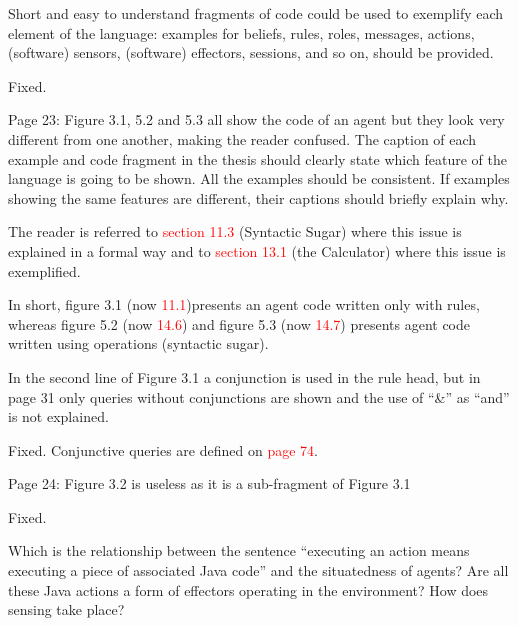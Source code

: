 \documentclass{article}
\newcommand*\R[1]{\textcolor{red}{#1}} %
\newcommand{\todo}[1]{[\textcolor{green}{TODO}: #1]}
\newenvironment{them}{\noindent\begingroup\color{blue}}{\endgroup\par}
\begin{document}
\begin{them}

Short and easy to understand fragments of code could be used to exemplify each
element of the language: examples for beliefs, rules, roles, messages, actions,
(software) sensors, (software) effectors, sessions, and so on, should be
provided.

\end{them}
Fixed. 

\begin{them}

Page 23:
Figure 3.1, 5.2 and 5.3 all show the code of an agent but they look very
different from one another, making the reader confused. The caption of each
example and code fragment in the thesis should clearly state which feature of
the language is going to be shown. All the examples should be consistent. If
examples showing the same features are different, their captions should briefly
explain why.

\end{them}
The reader is referred to \R{section 11.3} (Syntactic Sugar) where this issue
is explained in a formal way and to \R{section 13.1} (the Calculator) where
this issue is exemplified.

In short, figure 3.1 (now \R{11.1})presents an agent code written only with
rules, whereas figure 5.2 (now \R{14.6}) and figure 5.3 (now \R{14.7}) presents
agent code written using operations (syntactic sugar).

\begin{them}

In the second line of Figure 3.1 a conjunction is used in the rule head, but in
page 31 only queries without conjunctions are shown and the use of “\&” as
“and” is not explained.

\end{them}
Fixed. Conjunctive queries are defined on \R{page 74}. 

\begin{them}

Page 24:
Figure 3.2 is useless as it is a sub-fragment of Figure 3.1
\end{them}
Fixed. 

\begin{them}

Which is the relationship between the sentence “executing an action means
executing a piece of associated Java code” and the situatedness of agents? Are
all these Java actions a form of effectors operating in the environment? How
does sensing take place?

\end{them}
\todo{explain this} 
\end{document}
